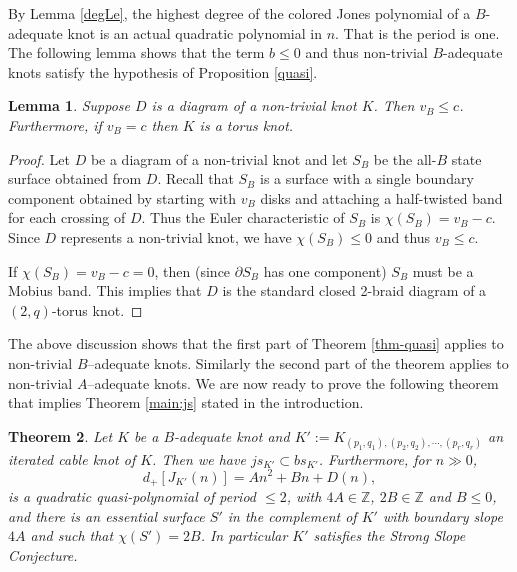 \documentclass[11pt]{amsart}
\newtheorem{theorem}{Theorem}[section]
\newtheorem{lemma}[theorem]{Lemma}
\theoremstyle{definition}
\def\BZ{\mathbb Z}
\begin{document}
By Lemma 
\ref{degLe}, the highest degree of the colored Jones polynomial of a $B$-adequate knot is 
an actual quadratic polynomial in $n$. That is the period is one.  The following lemma shows that
the term $b\leq 0$ and thus non-trivial $B$-adequate knots satisfy the hypothesis of Proposition \ref{quasi}.


\begin{lemma}
\label{v_B-c}
Suppose $D$ is a diagram of a non-trivial knot $K$. Then $v_B \le c$. Furthermore, 
if  $v_B = c$ then $K$ is a torus knot.
\end{lemma}

\begin{proof} Let $D$ be a diagram of a non-trivial knot and let $S_B$ be the all-$B$ state surface obtained from $D$.
Recall that $S_B$ is a surface with a single boundary component obtained by starting with $v_B$ disks 
and attaching 
a half-twisted band for each crossing of $D$. Thus the Euler characteristic of $S_B$ is
$\chi(S_B)=v_B-c$. Since $D$ represents a non-trivial knot, we have
$\chi(S_B)\le 0$ and thus $v_B \le c$.

If $\chi(S_B)= v_B-c=0$, then  (since $\partial S_B$ has one component) $S_B$ must be a Mobius band. This implies
that $D$ is the standard closed 2-braid diagram of   a $(2, q)$-torus  knot.
\end{proof}

The above discussion shows that the first part of Theorem \ref{thm-quasi} applies to non-trivial $B$--adequate knots. Similarly the second part of the theorem applies to non-trivial $A$--adequate knots.
We are now ready to  prove  the following theorem that implies Theorem \ref{main:js} stated in the introduction. 



\begin{theorem}\label{slopeadequate}
Let $K$ be a $B$-adequate knot and $K':=K_{(p_1,q_1),(p_2,q_2), \cdots, (p_r,q_r)}$ an iterated cable knot of $K$. 
Then we have $js_{K'} \subset bs_{K'}$.
Furthermore, for $n \gg 0$, 
$$
d_+[J_{K'}(n)]=An^2+Bn+D(n),
$$
is a quadratic quasi-polynomial of period $\le 2$, with $4A \in \BZ$,  $2B \in \BZ$ and $B \le 0$, and there is an essential surface $S'$ in the complement of $K'$  
with boundary slope $4A$ and such that $\chi(S')=2B$. In particular $K'$ satisfies the Strong Slope Conjecture.
\end{theorem}
\end{document}
